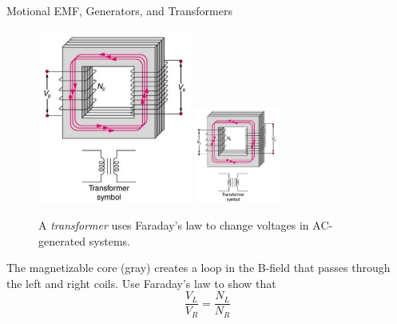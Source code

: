 \documentclass{beamer}
\begin{document}
\begin{frame}{Motional EMF, Generators, and Transformers}
\small
\begin{figure}
\centering
\includegraphics[width=0.45\textwidth,trim=0cm 5cm 0cm 0cm,clip=true]{figures/transformer.png}
\includegraphics[width=0.25\textwidth,trim=3.0cm 0cm 4cm 10cm,clip=true]{figures/transformer.png}
\caption{\label{fig:trans1} A \textit{transformer} uses Faraday's law to change voltages in AC-generated systems.}
\end{figure}
The magnetizable core (gray) creates a loop in the B-field that passes through the left and right coils.  Use Faraday's law to show that
\begin{equation}
\frac{V_L}{V_R} = \frac{N_L}{N_R}
\end{equation}
\end{frame}
\end{document}
